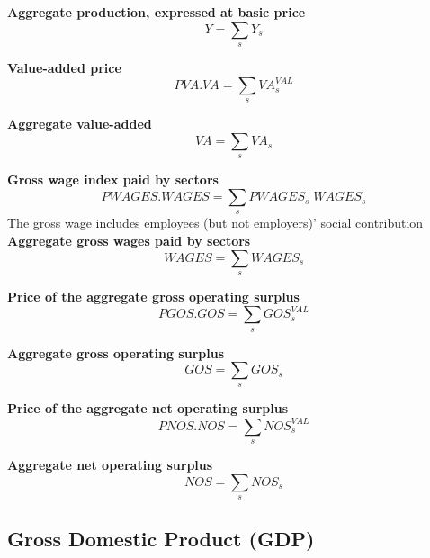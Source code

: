 \documentclass[12pt]{article}
\numberwithin{equation}{section}
\begin{document}
\noindent \textbf{Aggregate production, expressed at basic price} 
\begin{dmath}
Y = \sum_{s} Y_{s}
\label{SU.mdlY}
\end{dmath}

\noindent \textbf{Value-added price} 
\begin{dmath}
PVA . VA = \sum_{s} VA^{VAL}_{s}
\label{SU.mdlPVA}
\end{dmath}

\noindent \textbf{Aggregate value-added} 
\begin{dmath}
VA = \sum_{s} VA_{s}
\label{SU.mdlVA}
\end{dmath}

\noindent \textbf{Gross wage index paid by sectors} 
\begin{dmath}
PWAGES . WAGES = \sum_{s} PWAGES_{s} \; WAGES_{s}
\label{SU.mdlPWAGES}
\end{dmath}
The gross wage includes employees (but not employers)' social contribution \\


\noindent \textbf{Aggregate gross wages paid by sectors} 
\begin{dmath}
WAGES = \sum_{s} WAGES_{s}
\label{SU.mdlWAGES}
\end{dmath}


\noindent \textbf{Price of the aggregate gross operating surplus} 
\begin{dmath}
PGOS . GOS = \sum_{s} GOS^{VAL}_{s}
\label{SU.mdlPGOS}
\end{dmath}

\noindent \textbf{Aggregate gross operating surplus} 
\begin{dmath}
GOS = \sum_{s} GOS_{s}
\label{SU.mdlGOS}
\end{dmath}

\noindent \textbf{Price of the aggregate net operating surplus} 
\begin{dmath}
PNOS . NOS = \sum_{s} NOS^{VAL}_{s}
\label{SU.mdlPNOS}
\end{dmath}

\noindent \textbf{Aggregate net operating surplus} 
\begin{dmath}
NOS = \sum_{s} NOS_{s}
\label{SU.mdlNOS}
\end{dmath}



\subsection{Gross Domestic Product (GDP)}
\end{document}
